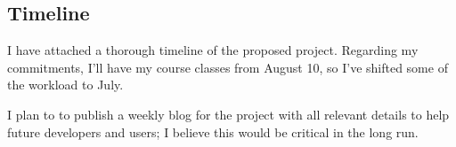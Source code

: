 \subsection{Timeline}

    I have attached a thorough timeline of the proposed project. 
    Regarding my commitments, I'll have my course classes from August 10, so I've shifted some of the workload to July.
    
    I plan to to publish a weekly blog for the project with all relevant details to help future developers and users; I believe this would be critical in the long run.
	
    
   
